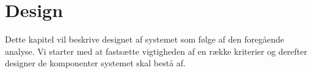 \chapter{Design}
\label{chap:design}
Dette kapitel vil beskrive designet af systemet som følge af den foregående analyse. Vi starter med at fastsætte vigtigheden af en række kriterier og derefter designer de komponenter systemet skal bestå af.



